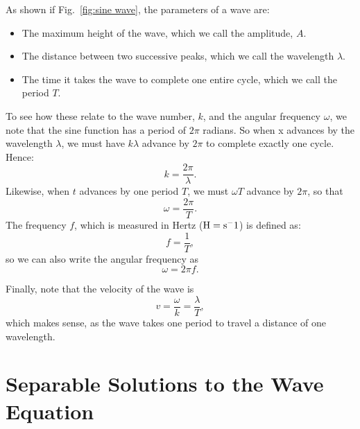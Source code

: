 \documentclass[12pt]{article}
\begin{document}
As shown if Fig.~\ref{fig:sine wave}, the parameters of a wave are:
\begin{itemize}
 \item The maximum height of the wave, which we call the amplitude, $A$.
 \item The distance between two successive peaks, which we call the wavelength $\lambda$.
 \item The time it takes the wave to complete one entire cycle, which we call the period $T$.
\end{itemize}
To see how these relate to the wave number, $k$, and the angular frequency $\omega$, we note that the sine function has a period of $2 \pi$ radians.  So when x advances by the wavelength $\lambda$, we must have $k \lambda$ advance by $2 \pi$ to complete exactly one cycle.  Hence:
\begin{equation}
k = \frac{2 \pi}{ \lambda}.
\end{equation}
Likewise, when $t$ advances by one period $T$, we must $\omega T$ advance by $2 \pi$, so that
\begin{equation}
\omega = \frac{2 \pi}{ T}.
\end{equation}
The frequency $f$, which is measured in Hertz (${\rm H} = {\rm s}^-1$) is defined as:
\begin{equation}
f= \frac{1}{ T},
\end{equation}
so we can also write the angular frequency as
\begin{equation}
\omega = 2 \pi f.
\end{equation}

Finally, note that the velocity of the wave is 
\begin{equation}
v = \frac{\omega}{k} = \frac{\lambda}{T} ,
\end{equation}
which makes sense, as the wave takes one period to travel a distance of one wavelength.


\section{Separable Solutions to the Wave Equation}
\end{document}
